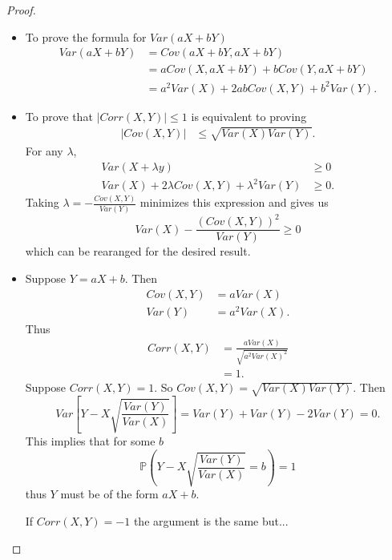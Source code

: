 \begin{proof} $ $
    \begin{itemize}
      \item To prove the formula for $Var(a X + b Y) $
        \begin{align*}
          Var(a X + b Y) &= Cov(a X + b Y, a X + b Y) \\
           &= a Cov(X, a X + b Y) + b Cov (Y, a X + b Y) \\
           &= a^2 Var(X) + 2abCov(X,Y) + b^2 Var(Y)
        .\end{align*}
      \item To prove that $|Corr(X, Y)| \leq 1$ is equivalent to proving
        \begin{align*}
          |Cov(X, Y)| &\leq \sqrt{Var(X) Var(Y)}
        .\end{align*}
        For any $\lambda$,
        \begin{align*}
          Var(X + \lambda y) &\geq 0  \\
          Var(X) + 2\lambda Cov(X,Y) + \lambda^2 Var(Y) &\geq 0
        .\end{align*}
        Taking $\lambda = -\frac{Cov(X,Y)}{Var(Y)}$ minimizes this expression and gives us
        \[Var(X) - \frac{(Cov(X,Y))^2}{Var(Y)} \geq 0\]
        which can be rearanged for the desired result.
      \item Suppose $Y = aX + b$. Then
        \begin{align*}
          Cov(X, Y) &= a Var(X) \\
          Var(Y) &= a^2 Var(X)
        .\end{align*}
        Thus 
        \begin{align*}
          Corr(X,Y) &= \frac{a Var(X)}{\sqrt{a^2 Var(X)^2}}\\
                    &= 1
        .\end{align*}
        Suppose $Corr(X,Y) = 1$. So $Cov(X,Y) = \sqrt{Var(X) Var(Y)}$. Then
        \[Var \left[Y - X \sqrt{\frac{Var(Y)}{Var(X)}} \right] = Var(Y) + Var(Y) - 2 Var(Y) = 0.\]
        This implies that for some $b$
        \[\mathbb{P}\left(Y - X \sqrt{\frac{Var(Y)}{Var(X)}}= b \right) = 1\]
        thus $Y$ must be of the form $aX + b$.

        \noindent If $Corr(X,Y) = -1$ the argument is the same but...
    \end{itemize}
\end{proof}
